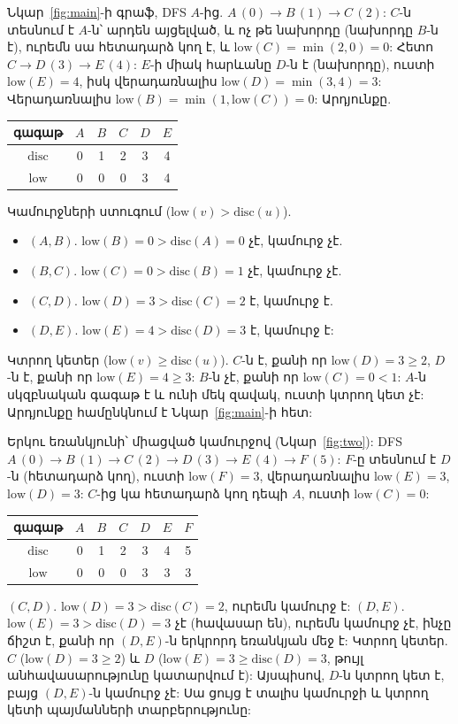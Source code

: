 \begin{example}\label{ex:t1}
Նկար~\ref{fig:main}-ի գրաֆ, DFS $A$-ից. $A\,(0)\to B\,(1)\to C\,(2)$: $C$-ն տեսնում է $A$-ն՝ արդեն այցելված, և ոչ թե նախորդը (նախորդը $B$-ն է), ուրեմն սա հետադարձ կող է, և $\mathrm{low}(C)=\min(2,0)=0$: Հետո $C\to D\,(3)\to E\,(4)$: $E$-ի միակ հարևանը $D$-ն է (նախորդը), ուստի $\mathrm{low}(E)=4$, իսկ վերադառնալիս $\mathrm{low}(D)=\min(3,4)=3$: Վերադառնալիս $\mathrm{low}(B)=\min(1,\mathrm{low}(C))=0$: Արդյունքը.
\begin{center}
\begin{tabular}{c|ccccc}
գագաթ & $A$ & $B$ & $C$ & $D$ & $E$\\
\hline
$\mathrm{disc}$ & 0 & 1 & 2 & 3 & 4\\
$\mathrm{low}$ & 0 & 0 & 0 & 3 & 4\\
\end{tabular}
\end{center}
Կամուրջների ստուգում ($\mathrm{low}(v)>\mathrm{disc}(u)$).
\begin{itemize}
  \item $(A,B)$. $\mathrm{low}(B)=0>\mathrm{disc}(A)=0$ չէ, կամուրջ չէ.
  \item $(B,C)$. $\mathrm{low}(C)=0>\mathrm{disc}(B)=1$ չէ, կամուրջ չէ.
  \item $(C,D)$. $\mathrm{low}(D)=3>\mathrm{disc}(C)=2$ է, կամուրջ է.
  \item $(D,E)$. $\mathrm{low}(E)=4>\mathrm{disc}(D)=3$ է, կամուրջ է:
\end{itemize}
Կտրող կետեր ($\mathrm{low}(v)\ge\mathrm{disc}(u)$). $C$-ն է, քանի որ $\mathrm{low}(D)=3\ge2$, $D$-ն է, քանի որ $\mathrm{low}(E)=4\ge3$: $B$-ն չէ, քանի որ $\mathrm{low}(C)=0<1$: $A$-ն սկզբնական գագաթ է և ունի մեկ զավակ, ուստի կտրող կետ չէ: Արդյունքը համընկնում է Նկար~\ref{fig:main}-ի հետ:
\end{example}

\begin{example}\label{ex:t2}
Երկու եռանկյունի՝ միացված կամուրջով (Նկար~\ref{fig:two}): DFS $A\,(0)\to B\,(1)\to C\,(2)\to D\,(3)\to E\,(4)\to F\,(5)$: $F$-ը տեսնում է $D$-ն (հետադարձ կող), ուստի $\mathrm{low}(F)=3$, վերադառնալիս $\mathrm{low}(E)=3$, $\mathrm{low}(D)=3$: $C$-ից կա հետադարձ կող դեպի $A$, ուստի $\mathrm{low}(C)=0$:
\begin{center}
\begin{tabular}{c|cccccc}
գագաթ & $A$ & $B$ & $C$ & $D$ & $E$ & $F$\\
\hline
$\mathrm{disc}$ & 0 & 1 & 2 & 3 & 4 & 5\\
$\mathrm{low}$ & 0 & 0 & 0 & 3 & 3 & 3\\
\end{tabular}
\end{center}
$(C,D)$. $\mathrm{low}(D)=3>\mathrm{disc}(C)=2$, ուրեմն կամուրջ է: $(D,E)$. $\mathrm{low}(E)=3>\mathrm{disc}(D)=3$ չէ (հավասար են), ուրեմն կամուրջ չէ, ինչը ճիշտ է, քանի որ $(D,E)$-ն երկրորդ եռանկյան մեջ է: Կտրող կետեր. $C$ ($\mathrm{low}(D)=3\ge2$) և $D$ ($\mathrm{low}(E)=3\ge\mathrm{disc}(D)=3$, թույլ անհավասարությունը կատարվում է): Այսպիսով, $D$-ն կտրող կետ է, բայց $(D,E)$-ն կամուրջ չէ: Սա ցույց է տալիս կամուրջի և կտրող կետի պայմանների տարբերությունը:
\end{example}

